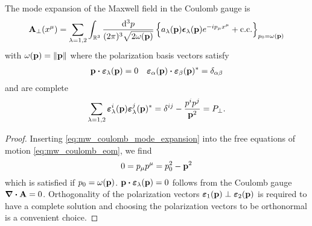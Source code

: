 \begin{theorem}\label{thm:mw_coulomb_mode_expansion}
	The mode expansion of the Maxwell field in the Coulomb gauge is
	\begin{equation}
		\vb{A}_\perp(x^\mu)
		=
		\sum_{\lambda=1,2}
		\int_{\mathbb{R}^3}\frac{\dd[3]{p}}{(2\pi)^3\sqrt{2\omega(\vb{p})}}
		\left\{
			a_\lambda(\vb{p})
			\boldsymbol{\epsilon}_\lambda(\vb{p})
			e^{-ip_\mu x^\mu}
			+
			\text{c.c.}
		\right\}_{p_0=\omega(\vb{p})}
		\label{eq:mw_coulomb_mode_expansion}
	\end{equation}
	with $\omega(\vb{p})=\norm{\vb{p}}$ where the polarization basis vectors satisfy
	\begin{align}
		\vb{p}
		\vdot
		\boldsymbol{\varepsilon}_\lambda(\vb{p})
		=
		0
		&&
		\boldsymbol{\varepsilon}_\alpha(\vb{p})
		\vdot
		\boldsymbol{\varepsilon}_\beta(\vb{p})^*
		=
		\delta_{\alpha\beta}
		\label{eq:mw_coulomb_polarization_basis}
	\end{align}
	and are complete~\cite[p.~341]{Srednicki2007}
	\begin{equation}
		\sum_{\lambda=1,2}
		\boldsymbol{\varepsilon}_\lambda^i(\vb{p})
		\boldsymbol{\varepsilon}_\lambda^j(\vb{p})^*
		=
		\delta^{ij}
		-
		\frac{p^ip^j}{\vb{p}^2}
		=
		P_\perp
		\label{eq:mw_coulomb_polarization_complete}
		.
	\end{equation}
\end{theorem}
\begin{proof}
	Inserting \cref{eq:mw_coulomb_mode_expansion} into the free equations of motion \cref{eq:mw_coulomb_eom}, we find
	\begin{equation*}
		0
		=
		p_\mu p^\mu
		=
		p_0^2
		-
		\vb{p}^2
	\end{equation*}
	which is satisfied if $p_0=\omega(\vb{p})$.
	$\vb{p}\vdot\boldsymbol{\varepsilon}_\lambda(\vb{p})=0$ follows from the Coulomb gauge $\div\vb{A}=0$.
	Orthogonality of the polarization vectors $\boldsymbol{\varepsilon}_1(\vb{p})\perp\boldsymbol{\varepsilon}_2(\vb{p})$ is required to have a complete solution and choosing the polarization vectors to be orthonormal is a convenient choice.
\end{proof}

